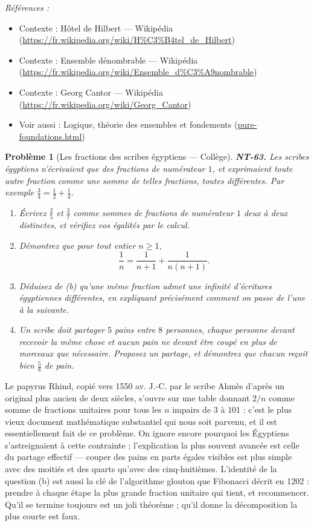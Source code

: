 \documentclass[11pt]{article}
\newtheorem{problem}{Problème}
\newenvironment{refs}{\par\small\noindent\emph{Références :}\begin{itemize}\setlength\itemsep{0pt}}{\end{itemize}\normalsize}
\begin{document}
\begin{refs}
\item Contexte : Hôtel de Hilbert --- Wikipédia (\url{https://fr.wikipedia.org/wiki/H%C3%B4tel_de_Hilbert})
\item Contexte : Ensemble dénombrable --- Wikipédia (\url{https://fr.wikipedia.org/wiki/Ensemble_d%C3%A9nombrable})
\item Contexte : Georg Cantor --- Wikipédia (\url{https://fr.wikipedia.org/wiki/Georg_Cantor})
\item Voir aussi : Logique, théorie des ensembles et fondements (\url{pure-foundations.html})
\end{refs}

\bigskip

\begin{problem}[{Les fractions des scribes égyptiens --- Collège}]
\textbf{NT-63.} Les scribes égyptiens n'écrivaient que des fractions de numérateur $ 1 $, et
exprimaient toute autre fraction comme une somme de telles fractions, toutes différentes. Par exemple
$ \frac{3}{4} = \frac{1}{2} + \frac{1}{4} $.
\begin{enumerate}
\item[(a)] Écrivez $ \frac{2}{5} $ et $ \frac{3}{7} $ comme sommes de fractions de numérateur $ 1 $
deux à deux distinctes, et vérifiez vos égalités par le calcul.
\item[(b)] Démontrez que pour tout entier $ n \ge 1 $,
\[ \frac{1}{n} = \frac{1}{n+1} + \frac{1}{n(n+1)} . \]
\item[(c)] Déduisez de (b) qu'une même fraction admet une infinité d'écritures égyptiennes différentes, en
expliquant précisément comment on passe de l'une à la suivante.
\item[(d)] Un scribe doit partager $ 5 $ pains entre $ 8 $ personnes, chaque personne devant recevoir la
même chose et aucun pain ne devant être coupé en plus de morceaux que nécessaire. Proposez un partage,
et démontrez que chacun reçoit bien $ \frac{5}{8} $ de pain.
\end{enumerate}

\end{problem}

\noindent Le papyrus Rhind, copié vers 1550 av. J.-C. par le scribe Ahmès d'après un original
plus ancien de deux siècles, s'ouvre sur une table donnant $ 2/n $ comme somme de fractions
unitaires pour tous les $ n $ impairs de $ 3 $ à $ 101 $ : c'est le plus vieux document
mathématique substantiel qui nous soit parvenu, et il est essentiellement fait de ce problème. On
ignore encore pourquoi les Égyptiens s'astreignaient à cette contrainte ; l'explication la plus
souvent avancée est celle du partage effectif --- couper des pains en parts égales visibles est plus
simple avec des moitiés et des quarts qu'avec des cinq-huitièmes. L'identité de la question (b) est
aussi la clé de l'algorithme glouton que Fibonacci décrit en 1202 : prendre
à chaque étape la plus grande fraction unitaire qui tient, et recommencer. Qu'il se termine toujours
est un joli théorème ; qu'il donne la décomposition la plus courte est faux.
\end{document}
